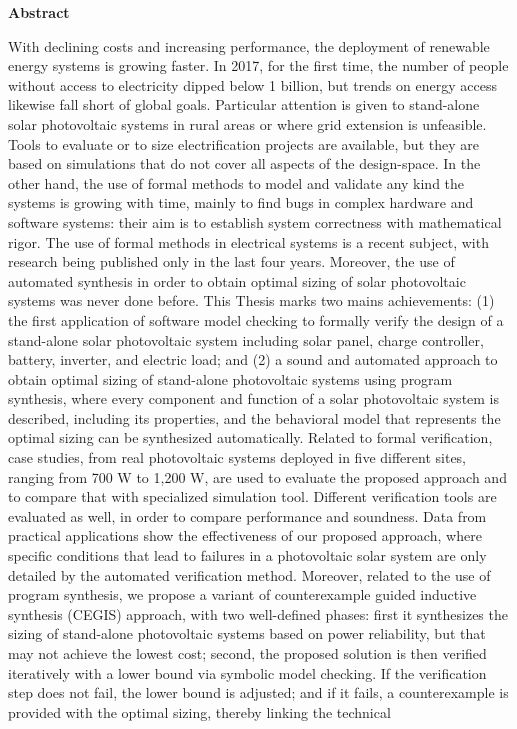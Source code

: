 \thispagestyle{plain}
\begin{center}
%    
%    
%    
    \vspace{0.9cm}
    \textbf{Abstract}
\end{center}
With declining costs and increasing performance, the deployment of renewable energy systems is growing faster. In 2017, for the first time, the number of people without access to electricity dipped below 1 billion, but trends on energy access likewise fall short of global goals. Particular attention is given to stand-alone solar photovoltaic systems in rural areas or where grid extension is unfeasible. Tools to evaluate or to size electrification projects are available, but they are based on simulations that do not cover all aspects of the design-space. In the other hand, the use of formal methods to model and validate any kind the systems is growing with time, mainly to find bugs in complex hardware and software systems: their aim is to establish system correctness with mathematical rigor. The use of formal methods in electrical systems is a recent subject, with research being published only in the last four years. Moreover, the use of automated synthesis in order to obtain optimal sizing of solar photovoltaic systems was never done before. This Thesis marks two mains achievements: (1) the first application of software model checking to formally verify the design of a stand-alone solar photovoltaic system including solar panel, charge controller, battery, inverter, and electric load; and (2) a sound and automated approach to obtain optimal sizing of stand-alone photovoltaic systems using program synthesis, where every component and function of a solar photovoltaic system is described, including its properties, and the behavioral model that represents the optimal sizing can be synthesized automatically. Related to formal verification, case studies, from real photovoltaic systems deployed in five different sites, ranging from 700 W to 1,200 W, are used to evaluate the proposed approach and to compare that with specialized simulation tool. Different verification tools are evaluated as well, in order to compare performance and soundness. Data from practical applications show the effectiveness of our proposed approach, where specific conditions that lead to failures in a photovoltaic solar system are only detailed by the automated verification method. Moreover, related to the use of program synthesis, we propose a variant of counterexample guided inductive synthesis (CEGIS) approach, with two well-defined phases: first it synthesizes the sizing of stand-alone photovoltaic systems based on power reliability, but that may not achieve the lowest cost; second, the proposed solution is then verified iteratively with a lower bound via symbolic model checking. If the verification step does not fail, the lower bound is adjusted; and if it fails, a counterexample is provided with the optimal sizing, thereby linking the technical 
